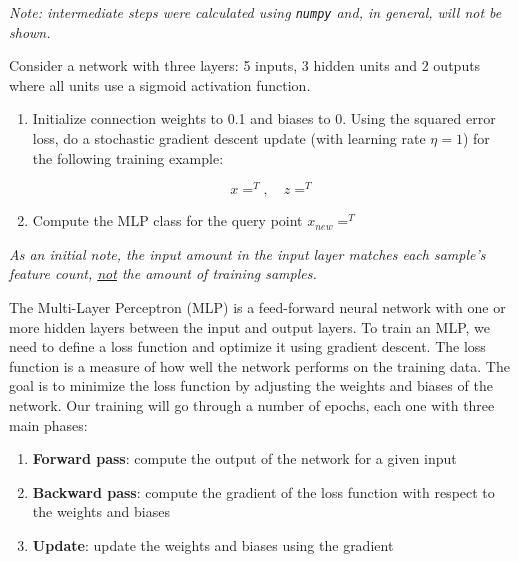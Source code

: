 \documentclass[12pt]{article}
\begin{document}
\textit{Note: intermediate steps were calculated using \texttt{numpy} and, in general, will not be shown.}

\begin{enumerate}[leftmargin=\labelsep]
  \begin{tcolorbox}[enhanced jigsaw,colback=bg,boxrule=0pt,arc=1pt]
    \item Consider a network with three layers: 5 inputs, 3 hidden units and 2 outputs
    where all units use a sigmoid activation function.

    \begin{enumerate}
      \item {Initialize connection weights to 0.1 and biases to 0. Using the squared
            error loss, do a stochastic gradient descent update (with learning rate $\eta = 1$)
            for the following training example:

            \begin{equation*}
              x = ^T, \quad z = ^T
            \end{equation*}} \label{ex-1-a}

      \item {Compute the MLP class for the query point $x_{new} = ^T$} \label{ex-1-b}
    \end{enumerate}
  \end{tcolorbox}

  \textit{As an initial note, the \textit{input amount} in the input layer matches each sample's
    feature count, \underline{not} the amount of training samples.}

  The Multi-Layer Perceptron (MLP) is a feed-forward neural network with one or more hidden layers
  between the input and output layers. To train an MLP, we need to define a loss function and
  optimize it using gradient descent. The loss function is a measure of how well the network
  performs on the training data. The goal is to minimize the loss function by adjusting the
  weights and biases of the network. Our training will go through a number of epochs, each
  one with three main phases:

  \begin{enumerate}
    \item \textbf{Forward pass}: compute the output of the network for a given input
    \item \textbf{Backward pass}: compute the gradient of the loss function with respect to the
          weights and biases
    \item \textbf{Update}: update the weights and biases using the gradient
  \end{enumerate}


\end{enumerate}
\end{document}
